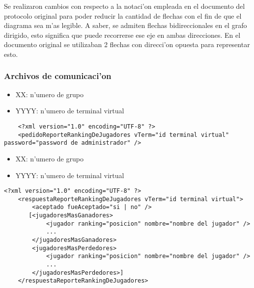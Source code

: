 Se realizaron cambios con respecto a la notaci'on empleada en el documento del protocolo original para poder reducir la cantidad de flechas con el fin de que el diagrama sea m'as legible. A saber, se admiten flechas bidireccionales en el grafo dirigido, esto significa que puede recorrerse ese eje en ambas direcciones. En el documento original se utilizaban 2 flechas con direcci'on opuesta para representar esto.


\clearpage
\subsubsection{Archivos de comunicaci'on}

 
\begin{itemize}
    \item{XX: n'umero de grupo}
    \item{YYYY: n'umero de terminal virtual}
\end{itemize}

\begin{verbatim}
    <?xml version="1.0" encoding="UTF-8" ?>
    <pedidoReporteRankingDeJugadores vTerm="id terminal virtual" password="password de administrador" />
\end{verbatim}


 
\begin{itemize}
    \item{XX: n'umero de grupo}
    \item{YYYY: n'umero de terminal virtual}
\end{itemize}

\begin{verbatim}
<?xml version="1.0" encoding="UTF-8" ?>
    <respuestaReporteRankingDeJugadores vTerm="id terminal virtual">
        <aceptado fueAceptado="si | no" />
       [<jugadoresMasGanadores>
            <jugador ranking="posicion" nombre="nombre del jugador" />
            ...
        </jugadoresMasGanadores>
        <jugadoresMasPerdedores>
            <jugador ranking="posicion" nombre="nombre del jugador" />
            ...
        </jugadoresMasPerdedores>]
    </respuestaReporteRankingDeJugadores>
\end{verbatim}



